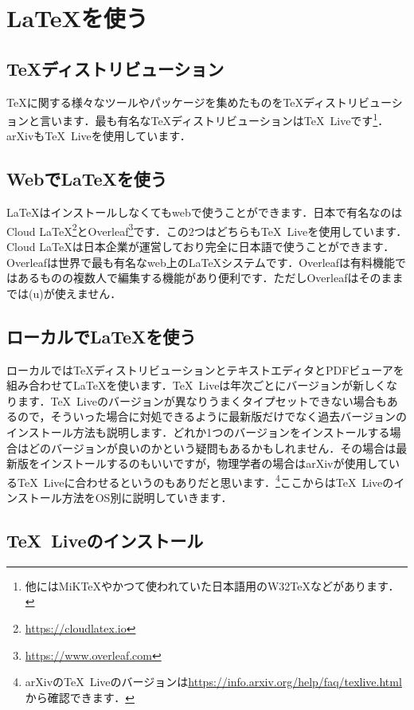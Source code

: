\section{\LaTeX を使う}
\subsection{\TeX ディストリビューション}
\TeX に関する様々なツールやパッケージを集めたものを\TeX ディストリビューションと言います．最も有名な\TeX ディストリビューションは\TeX\ Liveです\footnote{他にはMiK\TeX やかつて使われていた日本語用のW32\TeX などがあります．}．arXivも\TeX\ Liveを使用しています．

\subsection{Webで\LaTeX を使う}
\LaTeX はインストールしなくてもwebで使うことができます．日本で有名なのはCloud LaTeX\footnote{\url{https://cloudlatex.io}}とOverleaf\footnote{\url{https://www.overleaf.com}}です．この2つはどちらも\TeX\ Liveを使用しています．Cloud LaTeXは日本企業が運営しており完全に日本語で使うことができます．Overleafは世界で最も有名なweb上の\LaTeX システムです．Overleafは有料機能ではあるものの複数人で編集する機能があり便利です．ただしOverleafはそのままでは(u)\pLaTeX が使えません．

\subsection{ローカルで\LaTeX を使う}
ローカルでは\TeX ディストリビューションとテキストエディタとPDFビューアを組み合わせて\LaTeX を使います．\TeX\ Liveは年次ごとにバージョンが新しくなります．\TeX\ Liveのバージョンが異なりうまくタイプセットできない場合もあるので，そういった場合に対処できるように最新版だけでなく過去バージョンのインストール方法も説明します．どれか1つのバージョンをインストールする場合はどのバージョンが良いのかという疑問もあるかもしれません．その場合は最新版をインストールするのもいいですが，物理学者の場合はarXivが使用している\TeX\ Liveに合わせるというのもありだと思います．\footnote{arXivの\TeX\ Liveのバージョンは\url{https://info.arxiv.org/help/faq/texlive.html}から確認できます．}ここからは\TeX\ Liveのインストール方法をOS別に説明していきます．

\subsection{\TeX\ Liveのインストール}
